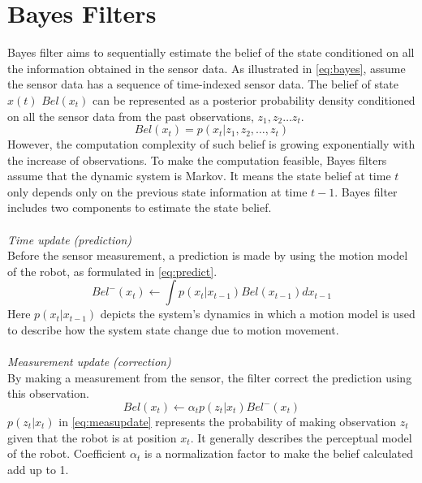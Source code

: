 \section{Bayes Filters}\label{sec:2.1}
Bayes filter aims to sequentially estimate the belief of the state conditioned on all the information obtained in the sensor data. As illustrated in \autoref{eq:bayes}, assume the sensor data has a sequence of time-indexed sensor data. The belief of state $x(t)$ $Bel(x_{t})$ can be represented as a posterior probability density conditioned on all the sensor data from the past observations, $z_{1}, z_{2} \ldots z_{t}$.
\begin{equation}
\label{eq:bayes}
Bel(x_{t}) = p(x_{t}|z_{1}, z_{2}, \ldots, z_{t})
\end{equation}
However, the computation complexity of such belief is growing exponentially with the increase of observations. To make the computation feasible, Bayes filters assume that the dynamic system is Markov. It means the state belief at time $t$ only depends only on the previous state information at time $t-1$. Bayes filter includes two components to estimate the state belief.
\\
\\
\noindent \textit{Time update (prediction)}\\
Before the sensor measurement, a prediction is made by using the motion model of the robot, as formulated in \autoref{eq:predict}.
\begin{equation}
\label{eq:predict}
Bel^{-}(x_{t}) \leftarrow \int p(x_{t}|x_{t-1})Bel(x_{t-1})dx_{t-1}
\end{equation}
Here $p(x_{t}|x_{t-1})$ depicts the system's dynamics in which a motion model is used to describe how the system state change due to motion movement.
\\
\\
\noindent \textit{Measurement update (correction)}\\
By making a measurement from the sensor, the filter correct the prediction using this observation.
\begin{equation}
\label{eq:measupdate}
Bel(x_{t}) \leftarrow \alpha_{t}p(z_{t}|x_{t})Bel^{-}(x_{t})
\end{equation}
$p(z_{t}|x_{t})$ in \autoref{eq:measupdate} represents the probability of making observation $z_{t}$ given that the robot is at position $x_{t}$. It generally describes the perceptual model of the robot. Coefficient $\alpha_{t}$ is a normalization factor to make the belief calculated add up to 1.

